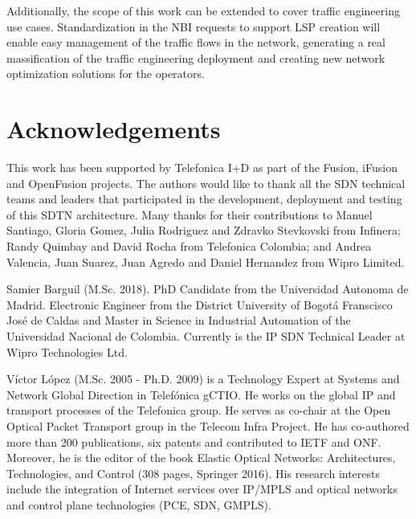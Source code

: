 \documentclass[a4paper,fleqn]{cas-dc}
\begin{document}
Additionally, the scope of this work can be extended to cover traffic engineering use cases. Standardization in the NBI requests to support LSP creation will enable easy management of the traffic flows in the network, generating a real massification of the traffic engineering deployment and creating new network optimization solutions for the operators.

\printcredits

\section*{Acknowledgements}
This work has been supported by Telefonica I+D as part of the Fusion, iFusion and OpenFusion projects. The authors would like to thank all the SDN technical teams and leaders that participated in the development, deployment and testing of this SDTN architecture. Many thanks for their contributions to Manuel Santiago, Gloria Gomez, Julia Rodriguez and Zdravko Stevkovski from Infinera; Randy Quimbay and David Rocha from Telefonica Colombia; and Andrea Valencia, Juan Suarez, Juan Agredo and Daniel Hernandez from Wipro Limited.   


%
%






Samier Barguil (M.Sc. 2018). PhD Candidate from the Universidad Autonoma de Madrid. Electronic Engineer from the District University of Bogot\'a Franscisco Jos\'e de Caldas and Master in Science in Industrial Automation of the Universidad Nacional de Colombia. Currently is the IP SDN Technical Leader at Wipro Technologies Ltd. 
\endbio


Víctor López (M.Sc. 2005 - Ph.D. 2009) is a Technology Expert at Systems and Network Global Direction in Telefónica gCTIO. He works on the global IP and transport processes of the Telefonica group. He serves as co-chair at the Open Optical Packet Transport group in the Telecom Infra Project. He has co-authored more than 200 publications, six patents and contributed to IETF and ONF. Moreover, he is the editor of the book Elastic Optical Networks: Architectures, Technologies, and Control (308 pages, Springer 2016). His research interests include the integration of Internet services over IP/MPLS and optical networks and control plane technologies (PCE, SDN, GMPLS).
\endbio
\end{document}
